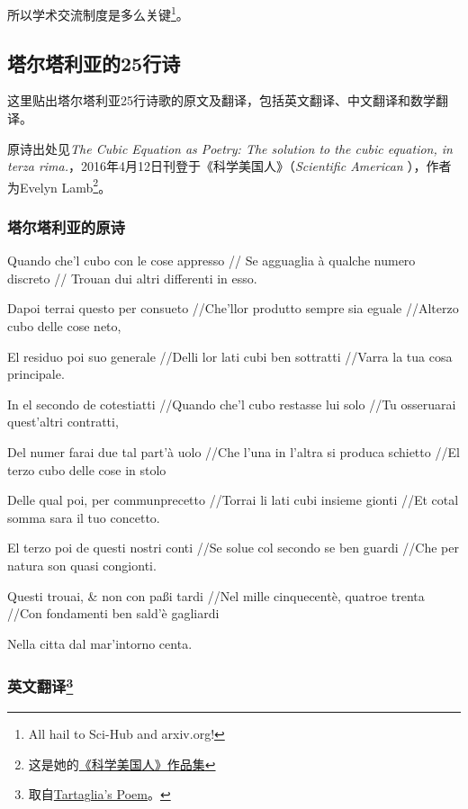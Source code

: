 所以学术交流制度是多么关键\footnote{All hail to Sci-Hub and arxiv.org! }。


\subsection{塔尔塔利亚的25行诗}\label{sub_PlyRtS_2}

这里贴出塔尔塔利亚25行诗歌的原文及翻译，包括英文翻译、中文翻译和数学翻译。

原诗出处见\textsl{The Cubic Equation as Poetry:
The solution to the cubic equation, in terza rima.}，2016年4月12日刊登于《科学美国人》（\textsl{Scientific American} ），作者为Evelyn Lamb\footnote{这是她的\href{https://www.scientificamerican.com/author/evelyn-lamb/}{《科学美国人》作品集}}。



\subsubsection{塔尔塔利亚的原诗}

Quando che'l cubo con le cose appresso 
//
Se agguaglia à qualche numero discreto
//
Trouan dui altri differenti in esso.



Dapoi terrai questo per consueto
​//Che'llor produtto sempre sia eguale
//​Alterzo cubo delle cose neto,
 

El residuo poi suo generale 
//Delli lor lati cubi ben sottratti
//​Varra la tua cosa principale.
 

In el secondo de cotestiatti 
​//Quando che'l cubo restasse lui solo 
//Tu osseruarai quest'altri contratti,
 

Del numer farai due tal part'à uolo 
//Che l'una in l'altra si produca schietto
//El terzo cubo delle cose in stolo
​

Delle qual poi, per communprecetto 
​//Torrai li lati cubi insieme gionti 
//Et cotal somma sara il tuo concetto.
 

El terzo poi de questi nostri conti 
//Se solue col secondo se ben guardi 
//Che per natura son quasi congionti.
 

Questi trouai, \& non con paßi tardi 
//Nel mille cinquecentè, quatroe trenta 
//Con fondamenti ben sald'è gagliardi
​

Nella citta dal mar'intorno centa.


\subsubsection{英文翻译\footnote{取自\href{https://www.maa.org/press/periodicals/convergence/how-tartaglia-solved-the-cubic-equation-tartaglias-poem}{Tartaglia's Poem}。}}

